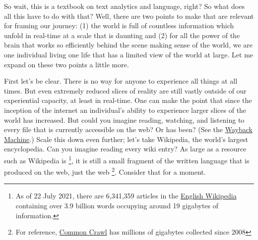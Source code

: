 \documentclass[
  letterpaper,
]{latex/krantz}
\begin{document}
So wait, this is a textbook on text analytics and language, right? So
what does all this have to do with that? Well, there are two points to
make that are relevant for framing our journey: (1) the world is full of
countless information which unfold in real-time at a scale that is
daunting and (2) for all the power of the brain that works so
efficiently behind the scene making sense of the world, we are one
individual living one life that has a limited view of the world at
large. Let me expand on these two points a little more.

First let's be clear. There is no way for anyone to experience all
things at all times. But even extremely reduced slices of reality are
still vastly outside of our experiential capacity, at least in
real-time. One can make the point that since the inception of the
internet an individual's ability to experience larger slices of the
world has increased. But could you imagine reading, watching, and
listening to every file that is currently accessible on the web? Or has
been? (See the \href{https://web.archive.org/}{Wayback Machine}.) Scale
this down even further; let's take Wikipedia, the world's largest
encyclopedia. Can you imagine reading every wiki entry? As large as a
resource such as Wikipedia is \footnote{As of 22 July 2021, there are
  6,341,359 articles in the
  \href{https://en.wikipedia.org/wiki/English_Wikipedia}{English
  Wikipedia} containing over 3.9 billion words occupying around 19
  gigabytes of information.}, it is still a small fragment of the
written language that is produced on the web, just the web \footnote{For
  reference, \href{https://commoncrawl.org/big-picture/}{Common Crawl}
  has millions of gigabytes collected since 2008}. Consider that for a
moment.
\end{document}
